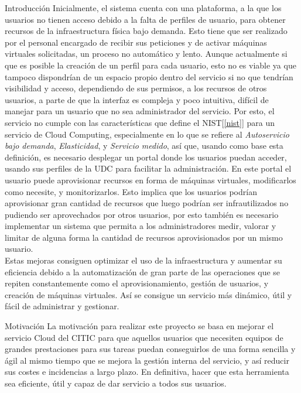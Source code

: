 \begin{chapter}{Introducción}
Inicialmente, el sistema cuenta con una plataforma, a la que los usuarios no tienen acceso debido a la falta de perfiles de usuario, para obtener recursos de la infraestructura física bajo demanda. Esto tiene que ser realizado por el personal encargado de recibir sus peticiones y de activar máquinas virtuales solicitadas, un proceso no automático y lento.
Aunque actualmente si que es posible la creación de un perfil para cada usuario, esto no es viable ya que tampoco dispondrían de un espacio propio dentro del servicio si no que tendrían visibilidad y acceso, dependiendo de sus permisos, a los recursos de otros usuarios, a parte de que la interfaz es compleja y poco intuitiva, difícil de manejar para un usuario que no sea administrador del servicio.
Por esto, el servicio no cumple con las características que define el NIST[\ref{nist}] para un servicio de Cloud Computing, especialmente en lo que se refiere al \emph{Autoservicio bajo demanda}, \emph{Elasticidad}, y \emph{Servicio medido}, así que, usando como base esta definición, es necesario desplegar un portal donde los usuarios puedan acceder, usando sus perfiles de la UDC para facilitar la administración. En este portal el usuario puede aprovisionar recursos en forma de máquinas virtuales, modificarlos como necesite, y monitorizarlos. Esto implica que los usuarios podrían aprovisionar gran cantidad de recursos que luego podrían ser infrautilizados no pudiendo ser aprovechados por otros usuarios, por esto también es necesario implementar un sistema que permita a los administradores medir, valorar y limitar de alguna forma la cantidad de recursos aprovisionados por un mismo usuario.\\

Estas mejoras consiguen optimizar el uso de la infraestructura y aumentar su eficiencia debido a la automatización de gran parte de las operaciones que se repiten constantemente como el aprovisionamiento, gestión de usuarios, y creación de máquinas virtuales. Así se consigue un servicio más dinámico, útil y fácil de administrar y gestionar.



\begin{section}{Motivación}
La motivación para realizar este proyecto se basa en mejorar el servicio Cloud del CITIC para que aquellos usuarios que necesiten equipos de grandes prestaciones para sus tareas puedan conseguirlos de una forma sencilla y ágil al mismo tiempo que se mejora la gestión interna del servicio, y así reducir sus costes e incidencias a largo plazo. En definitiva, hacer que esta herramienta sea eficiente, útil y capaz de dar servicio a todos sus usuarios.
\end{section}


\end{chapter}
